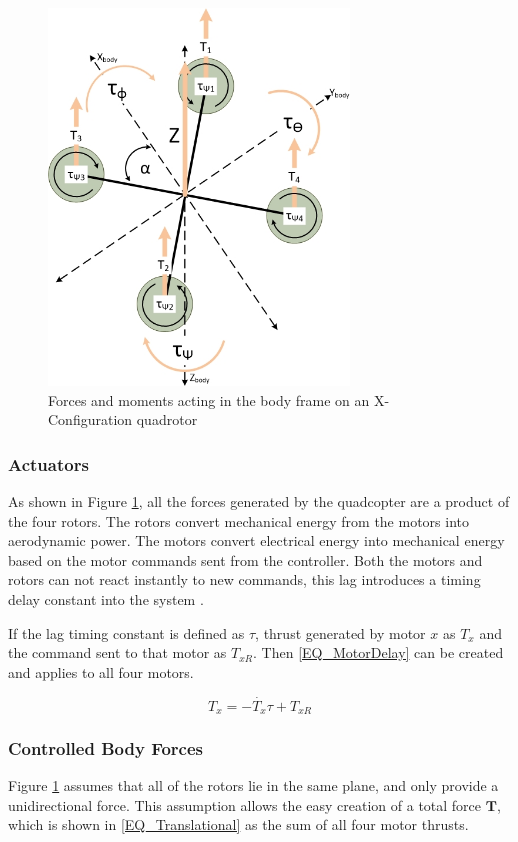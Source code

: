 	\begin{figure}[H]
		\centering
		\includegraphics[height = 10cm]{Images/Literature/quadforces.jpg}     
		\caption{Forces and moments acting in the body frame on an X-Configuration quadrotor}
		\label{IM_Forces}
	\end{figure}
	
	
		\subsubsection{Actuators}
		As shown in Figure \ref{IM_Forces}, all the forces generated by the quadcopter are a product of the four rotors. The rotors convert mechanical energy from the motors into aerodynamic power. The motors convert electrical energy into mechanical energy based on the motor commands sent from the controller. Both the motors and rotors can not react instantly to new commands, this lag introduces a timing delay constant into the system \cite{Moller2015}.
		
		If the lag timing constant is defined as $\tau$, thrust generated by motor $x$ as $T_x$ and the command sent to that motor as $T_{xR}$. Then \eqref{EQ_MotorDelay} can be created and applies to all four motors.
		
		\begin{equation}
		T_x = -\dot{T_x} \tau + T_{xR}
		\label{EQ_MotorDelay}
		\end{equation}
		 		
		\subsubsection{Controlled Body Forces}
		Figure \ref{IM_Forces} assumes that all of the rotors lie in the same plane, and only provide a unidirectional force. This assumption allows the easy creation of a total force $\textbf{T}$, which is shown in \eqref{EQ_Translational} as the sum of all four motor thrusts. 
		
